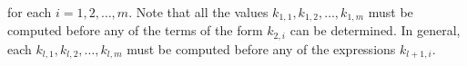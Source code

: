 for each $i=1,2, \ldots, m$. Note that all the values $k_{1,1}, k_{1,2}, \ldots, k_{1, m}$ must be computed before any of the terms of the form $k_{2, i}$ can be determined. In general, each $k_{l, 1}, k_{l, 2}, \ldots, k_{l, m}$ must be computed before any of the expressions $k_{l+1, i}$.
%
%
%
%
%
%
%
%
%
%
%
%
%
%
%
%
%
%

